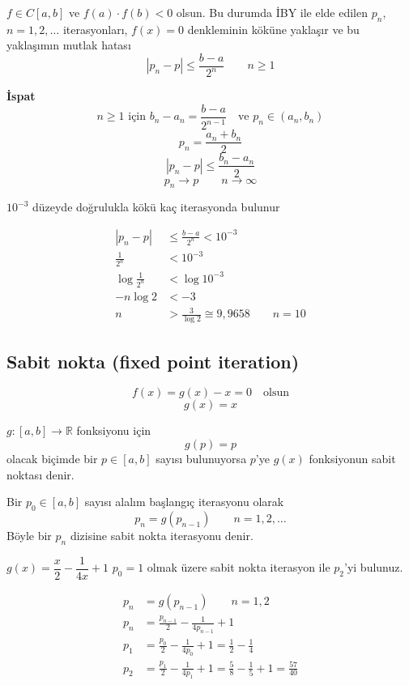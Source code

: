 \documentclass[11pt,a4paper]{article}
\begin{document}
\begin{teorem}[1]
$f\in C[a,b]$ ve $f(a)\cdot f(b)<0$ olsun. Bu durumda İBY ile elde edilen $p_n$, $n=1,2,\dots$
iterasyonları, $f(x)=0$ denkleminin köküne yaklaşır ve bu yaklaşımın mutlak hatası
\[ |p_n-p|\le\frac{b-a}{2^n} \qquad n\ge 1 \]
\end{teorem}

\textbf{İspat}
\[
  n\ge1 \text{ için } b_n-a_n=\frac{b-a}{2^{n-1}} \quad\text{ve } p_n\in(a_n,b_n)
\]
\[ p_n=\frac{a_n+b_n}{2} \]
\[ |p_n-p|\le\frac{b_n-a_n}{2} \]
\[ p_n\to p \qquad n\to\infty \]

\begin{ornek}[2]
$10^{-3}$ düzeyde doğrulukla kökü kaç iterasyonda bulunur
\end{ornek}
\begin{align*}
  |p_n-p|&\le\frac{b-a}{2^n}<10^{-3}\\
  \frac{1}{2^n}&<10^{-3}\\
  \log\frac{1}{2^n}&<\log10^{-3}\\
  -n\log2&<-3\\
  n&>\frac{3}{\log2}\cong 9{,}9658 \qquad n=10
\end{align*}

\subsection{Sabit nokta (fixed point iteration)}
\[ f(x)=g(x)-x=0 \quad\text{olsun} \]
\[ g(x)=x \]

\begin{tanim}
$g:[a,b]\to\mathbb{R}$ fonksiyonu için
\[ g(p)=p \]
olacak biçimde bir $p\in[a,b]$ sayısı bulunuyorsa $p$'ye $g(x)$ fonksiyonun sabit noktası denir.
\end{tanim}

Bir $p_0\in[a,b]$ sayısı alalım başlangıç iterasyonu olarak
\[ p_n=g(p_{n-1}) \qquad n=1,2,\dots \]
Böyle bir $p_n$ dizisine sabit nokta iterasyonu denir.

\begin{ornek}[3]
$g(x)=\dfrac{x}{2}-\dfrac{1}{4x}+1$ \quad $p_0=1$ olmak üzere sabit nokta iterasyon ile $p_2$'yi bulunuz.
\end{ornek}
\begin{align*}
  p_n&=g(p_{n-1}) \qquad n=1,2\\
  p_n&=\frac{p_{n-1}}{2}-\frac{1}{4p_{n-1}}+1\\
  p_1&=\frac{p_0}{2}-\frac{1}{4p_0}+1=\frac12-\frac14\\
  p_2&=\frac{p_1}{2}-\frac{1}{4p_1}+1=\frac58-\frac15+1=\frac{57}{40}
\end{align*}
\end{document}
